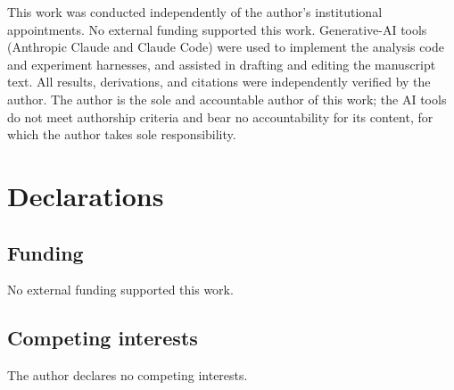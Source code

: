 \documentclass[pdflatex,sn-mathphys,Numbered]{sn-jnl}
\begin{document}
\backmatter

This work was conducted independently of the author's institutional appointments.
No external funding supported this work. Generative-AI tools (Anthropic Claude and
Claude Code) were used to implement the analysis code and experiment harnesses, and
assisted in drafting and editing the manuscript text. All results, derivations, and
citations were independently verified by the author. The author is the sole and
accountable author of this work; the AI tools do not meet authorship criteria and
bear no accountability for its content, for which the author takes sole
responsibility.

\section*{Declarations}

\subsection*{Funding}
No external funding supported this work.

\subsection*{Competing interests}
The author declares no competing interests.
\end{document}
